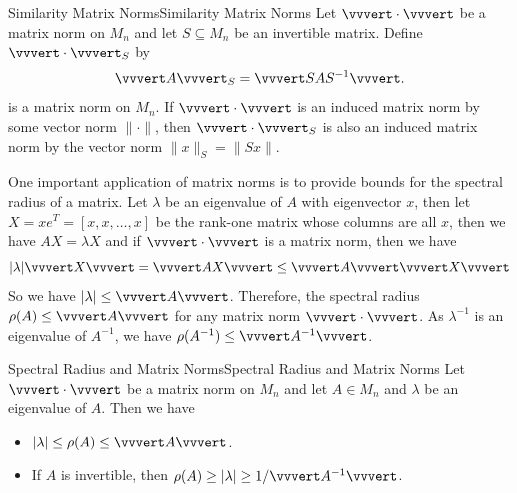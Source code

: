\documentclass[../main.tex]{subfiles}
\begin{document}
\begin{theorem}{Similarity Matrix Norms}{Similarity Matrix Norms}
  Let $\vvvert \cdot \vvvert$ be a matrix norm on $M_n$ and let $S \subseteq M_n$ be an invertible matrix. Define $\vvvert \cdot \vvvert_S$ by
  \begin{equation}
    \vvvert A \vvvert_S = \vvvert S A S^{-1} \vvvert.
  \end{equation}
  is a matrix norm on $M_n$. If $\vvvert \cdot \vvvert$ is an induced matrix norm by some vector norm $\|\cdot\|$, then $\vvvert \cdot \vvvert_S$ is also an induced matrix norm by the vector norm $\|x\|_S = \|S x\|$.
\end{theorem}

One important application of matrix norms is to provide bounds for the spectral radius of a matrix. Let $\lambda$ be an eigenvalue of $A$ with eigenvector $x$, then let $X = x e^T = [x,x,\ldots,x]$ be the rank-one matrix whose columns are all $x$, then we have $AX = \lambda X$ and if $\vvvert \cdot \vvvert$ is a matrix norm, then we have
\begin{equation*}
  |\lambda| \vvvert X \vvvert = \vvvert A X \vvvert \leq \vvvert A \vvvert \vvvert X \vvvert
\end{equation*}
So we have $|\lambda| \leq \vvvert A \vvvert$. Therefore, the spectral radius $\rho(A) \leq \vvvert A \vvvert$ for any matrix norm $\vvvert \cdot \vvvert$. As $\lambda^{-1}$ is an eigenvalue of $A^{-1}$, we have $\rho(A^{-1}) \leq \vvvert A^{-1} \vvvert$.

\begin{theorem}{Spectral Radius and Matrix Norms}{Spectral Radius and Matrix Norms}
  Let $\vvvert \cdot \vvvert$ be a matrix norm on $M_n$ and let $A \in M_n$ and $\lambda$ be an eigenvalue of $A$. Then we have
  \begin{itemize}
    \item $|\lambda| \leq \rho(A) \leq \vvvert A \vvvert$.
    \item If $A$ is invertible, then $\rho(A) \geq |\lambda| \geq 1 / \vvvert A^{-1} \vvvert$.
  \end{itemize}
\end{theorem}
\end{document}
